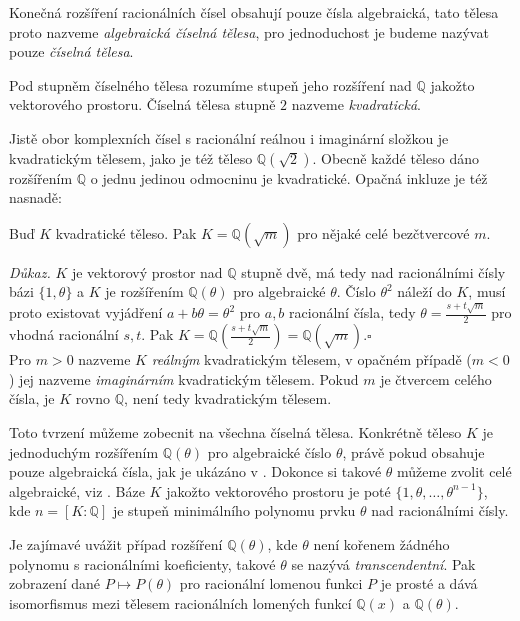 \documentclass[12pt]{report}
\begin{document}
\begin{definice}
Konečná rozšíření racionálních čísel obsahují pouze čísla algebraická, tato tělesa proto nazveme \textit{algebraická číselná tělesa}, pro jednoduchost je budeme nazývat pouze \textit{číselná tělesa}.
\end{definice}


\begin{definice}
Pod stupněm číselného tělesa rozumíme stupeň jeho rozšíření nad $\mathbb{Q}$ jakožto vektorového prostoru. Číselná tělesa stupně $2$ nazveme \textit{kvadratická}.
\end{definice}

Jistě obor komplexních čísel s racionální reálnou i imaginární složkou je kvadratickým tělesem, jako je též těleso $\mathbb{Q}(\sqrt{2})$. Obecně každé těleso dáno rozšířením $\mathbb{Q}$ o jednu jedinou odmocninu je kvadratické. Opačná inkluze je též nasnadě:

\begin{veta}
Buď $K$ kvadratické těleso. Pak $K = \mathbb{Q}(\sqrt{m})$ pro nějaké celé bezčtvercové $m$.
\end{veta}
\noindent \textit{Důkaz.} $K$ je vektorový prostor nad $\mathbb{Q}$ stupně dvě, má tedy nad racionálními čísly bázi $\lbrace 1, \theta \rbrace$ a $K$ je rozšířením $\mathbb{Q}(\theta)$ pro algebraické $\theta$. Číslo $\theta ^2$ náleží do $K$, musí proto existovat vyjádření $a+b\theta = \theta ^2$ pro $a,b$ racionální čísla, tedy $\theta = \frac{s+t\sqrt{m}}{2}$ pro vhodná racionální $s,t$. Pak $K = \mathbb{Q}\left(\frac{s+t\sqrt{m}}{2} \right) = \mathbb{Q}(\sqrt{m})$.\hfill $\square$\\

Pro $m > 0$ nazveme $K$ \textit{reálným} kvadratickým tělesem, v opačném případě ($m < 0$) jej nazveme \textit{imaginárním} kvadratickým tělesem. Pokud $m$ je čtvercem celého čísla, je $K$ rovno $\mathbb{Q}$, není tedy kvadratickým tělesem.

Toto tvrzení můžeme zobecnit na všechna číselná tělesa. Konkrétně těleso $K$ je jednoduchým rozšířením $\mathbb{Q}(\theta)$ pro algebraické číslo $\theta$, právě pokud obsahuje pouze algebraická čísla, jak je ukázáno v \cite[Věta 11.12]{Rosicky}. Dokonce si takové $\theta$ můžeme zvolit celé algebraické, viz \cite[Lemma 4.3.8]{Perutka}. Báze $K$ jakožto vektorového prostoru je poté $\lbrace 1,\theta,\dots,\theta ^{n-1} \rbrace$, kde $n = [K : \mathbb{Q}]$ je stupeň minimálního polynomu prvku $\theta$ nad racionálními čísly. 

\begin{poznamka} 
Je zajímavé uvážit případ rozšíření $\mathbb{Q}(\theta)$, kde $\theta$ není kořenem žádného polynomu s racionálními koeficienty, takové $\theta$ se nazývá \textit{transcendentní}. Pak zobrazení dané $P \mapsto P(\theta)$ pro racionální lomenou funkci $P$ je prosté a dává isomorfismus mezi tělesem racionálních lomených funkcí $\mathbb{Q}(x)$ a $\mathbb{Q}(\theta)$.
\end{poznamka}
\end{document}
